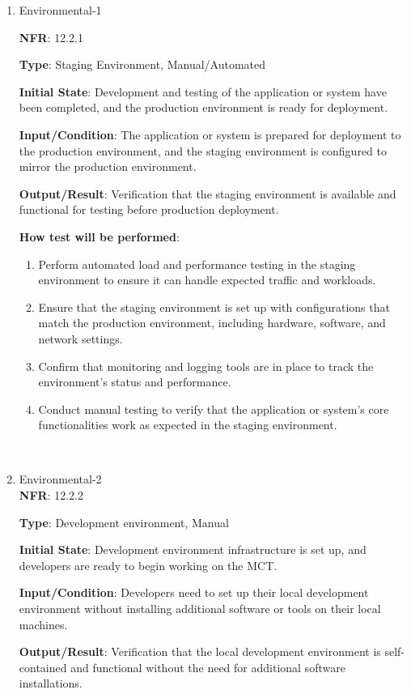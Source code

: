\documentclass[12pt, titlepage]{article}
\begin{document}
\begin{enumerate}

\item{Environmental-1\\}

\textbf{NFR}: 12.2.1

\textbf{Type}: Staging Environment, Manual/Automated

\textbf{Initial State}: Development and testing of the application or system have been completed, and the production environment is ready for deployment.

\textbf{Input/Condition}: The application or system is prepared for deployment to the production environment, and the staging environment is configured to mirror the production environment.

\textbf{Output/Result}: Verification that the staging environment is available and functional for testing before production deployment.

\textbf{How test will be performed}: 
\begin{enumerate}
    \item Perform automated load and performance testing in the staging environment to ensure it can handle expected traffic and workloads.
    \item Ensure that the staging environment is set up with configurations that match the production environment, including hardware, software, and network settings.
    \item Confirm that monitoring and logging tools are in place to track the environment's status and performance.
    \item Conduct manual testing to verify that the application or system's core functionalities work as expected in the staging environment.
\end{enumerate}
\\				
\item{Environmental-2 \\}
\textbf{NFR}: 12.2.2

\textbf{Type}: Development environment, Manual

\textbf{Initial State}: Development environment infrastructure is set up, and developers are ready to begin working on the MCT.

\textbf{Input/Condition}: Developers need to set up their local development environment without installing additional software or tools on their local machines.

\textbf{Output/Result}: Verification that the local development environment is self-contained and functional without the need for additional software installations.


\end{enumerate}
\end{document}
